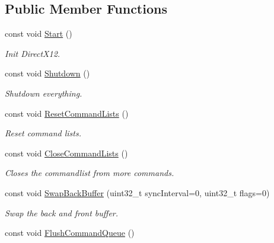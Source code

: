 \subsection*{Public Member Functions}
\begin{DoxyCompactItemize}
\item 
const void \hyperlink{class_ensum_1_1_graphics_1_1_direct3_d12_ab7149b342ff2557e9e4662856b773156}{Start} ()\hypertarget{class_ensum_1_1_graphics_1_1_direct3_d12_ab7149b342ff2557e9e4662856b773156}{}\label{class_ensum_1_1_graphics_1_1_direct3_d12_ab7149b342ff2557e9e4662856b773156}

\begin{DoxyCompactList}\small\item\em Init Direct\+X12. \end{DoxyCompactList}\item 
const void \hyperlink{class_ensum_1_1_graphics_1_1_direct3_d12_a08122d8124d9abfe0394f11811889698}{Shutdown} ()\hypertarget{class_ensum_1_1_graphics_1_1_direct3_d12_a08122d8124d9abfe0394f11811889698}{}\label{class_ensum_1_1_graphics_1_1_direct3_d12_a08122d8124d9abfe0394f11811889698}

\begin{DoxyCompactList}\small\item\em Shutdown everything. \end{DoxyCompactList}\item 
const void \hyperlink{class_ensum_1_1_graphics_1_1_direct3_d12_a6f548cfdf2179dd205e8f342f4a787c3}{Reset\+Command\+Lists} ()
\begin{DoxyCompactList}\small\item\em Reset command lists. \end{DoxyCompactList}\item 
const void \hyperlink{class_ensum_1_1_graphics_1_1_direct3_d12_a1ec3165b83d7d334911618e5399ba463}{Close\+Command\+Lists} ()
\begin{DoxyCompactList}\small\item\em Closes the commandlist from more commands. \end{DoxyCompactList}\item 
const void \hyperlink{class_ensum_1_1_graphics_1_1_direct3_d12_a860474f86765106018b843df44ee2705}{Swap\+Back\+Buffer} (uint32\+\_\+t sync\+Interval=0, uint32\+\_\+t flags=0)\hypertarget{class_ensum_1_1_graphics_1_1_direct3_d12_a860474f86765106018b843df44ee2705}{}\label{class_ensum_1_1_graphics_1_1_direct3_d12_a860474f86765106018b843df44ee2705}

\begin{DoxyCompactList}\small\item\em Swap the back and front buffer. \end{DoxyCompactList}\item 
const void \hyperlink{class_ensum_1_1_graphics_1_1_direct3_d12_a32270d77585e93f05b15e1769e37434a}{Flush\+Command\+Queue} ()\hypertarget{class_ensum_1_1_graphics_1_1_direct3_d12_a32270d77585e93f05b15e1769e37434a}{}\label{class_ensum_1_1_graphics_1_1_direct3_d12_a32270d77585e93f05b15e1769e37434a}


\end{DoxyCompactItemize}
